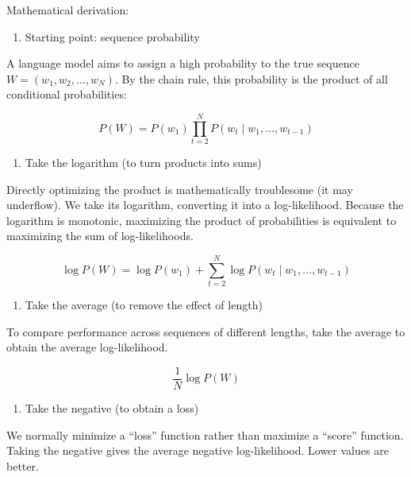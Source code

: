 Mathematical derivation:

\begin{enumerate}
\def\labelenumi{\arabic{enumi}.}
\tightlist
\item
  Starting point: sequence probability
\end{enumerate}

A language model aims to assign a high probability to the true sequence \(W=(w_1,w_2,\ldots,w_N)\). By the chain rule, this probability is the product of all conditional probabilities:

\[
P(W)=P(w_1)\prod_{t=2}^{N}P(w_t\mid w_1,\ldots,w_{t-1})
\]

\begin{enumerate}
\def\labelenumi{\arabic{enumi}.}
\setcounter{enumi}{1}
\tightlist
\item
  Take the logarithm (to turn products into sums)
\end{enumerate}

Directly optimizing the product is mathematically troublesome (it may underflow). We take its logarithm, converting it into a log-likelihood. Because the logarithm is monotonic, maximizing the product of probabilities is equivalent to maximizing the sum of log-likelihoods.

\[
\log P(W)=\log P(w_1)+\sum_{t=2}^{N}\log P(w_t\mid w_1,\ldots,w_{t-1})
\]

\begin{enumerate}
\def\labelenumi{\arabic{enumi}.}
\setcounter{enumi}{2}
\tightlist
\item
  Take the average (to remove the effect of length)
\end{enumerate}

To compare performance across sequences of different lengths, take the average to obtain the average log-likelihood.

\[
\frac{1}{N}\log P(W)
\]

\begin{enumerate}
\def\labelenumi{\arabic{enumi}.}
\setcounter{enumi}{3}
\tightlist
\item
  Take the negative (to obtain a loss)
\end{enumerate}

We normally minimize a ``loss'' function rather than maximize a ``score'' function. Taking the negative gives the average negative log-likelihood. Lower values are better.

